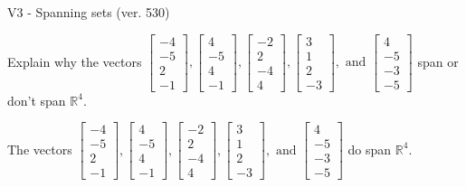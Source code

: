 \begin{exercise}
  \begin{exerciseTitle}V3 - Spanning sets (ver. 530)\end{exerciseTitle}
  \begin{exerciseStatement}
    Explain why the vectors \(\left[\begin{array}{r}
-4 \\
-5 \\
2 \\
-1
\end{array}\right] , \left[\begin{array}{r}
4 \\
-5 \\
4 \\
-1
\end{array}\right] , \left[\begin{array}{r}
-2 \\
2 \\
-4 \\
4
\end{array}\right] , \left[\begin{array}{r}
3 \\
1 \\
2 \\
-3
\end{array}\right] , \text{ and } \left[\begin{array}{r}
4 \\
-5 \\
-3 \\
-5
\end{array}\right]\) span or don't span \(\mathbb{R}^4\). 
	


  \end{exerciseStatement}
  \begin{exerciseAnswer}
   The vectors \(\left[\begin{array}{r}
-4 \\
-5 \\
2 \\
-1
\end{array}\right] , \left[\begin{array}{r}
4 \\
-5 \\
4 \\
-1
\end{array}\right] , \left[\begin{array}{r}
-2 \\
2 \\
-4 \\
4
\end{array}\right] , \left[\begin{array}{r}
3 \\
1 \\
2 \\
-3
\end{array}\right] , \text{ and } \left[\begin{array}{r}
4 \\
-5 \\
-3 \\
-5
\end{array}\right]\) 
  	 do  
	span \(\mathbb{R}^4\).
  



\end{exerciseAnswer}
\end{exercise}
